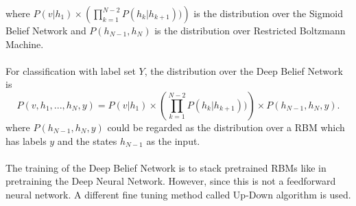 \documentclass[12pt]{article}
\begin{document}
where $P(v| h_1) \times\left(\prod_{k=1}^{N-2}  P(h_k| h_{k+1}))\right)$ is the distribution over the Sigmoid Belief Network and $P(h_{N-1},h_N)$ is the distribution over Restricted Boltzmann Machine.\\
\\
For classification with label set $Y$, the distribution over the Deep Belief Network is
\begin{equation}
P(v, h_1, ..., h_N, y)  = P(v| h_1) \times\left(\prod_{k=1}^{N-2}  P(h_k| h_{k+1}))\right)\times P(h_{N-1},h_N, y).
\end{equation}
where $P(h_{N-1},h_N, y)$ could be regarded as the distribution over a RBM which has labels $y$ and the states $h_{N-1}$ as the input.\\
\\
The training of the Deep Belief Network is to stack pretrained RBMs like in pretraining the Deep Neural Network. However, since this is not a feedforward neural network. A different fine tuning method called Up-Down algorithm is used.
\end{document}
